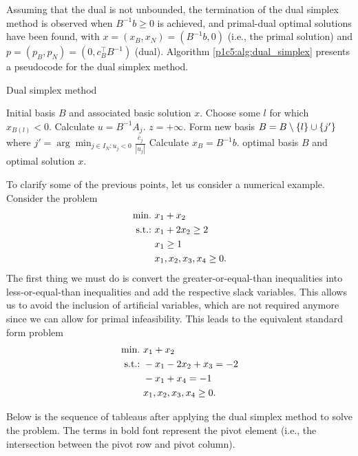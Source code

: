 Assuming that the dual is not unbounded, the termination of the dual simplex method is observed when $B^{-1}b \geq 0$ is achieved, and primal-dual optimal solutions have been found, with $x = (x_B,x_N) = (B^{-1}b, 0)$ (i.e., the primal solution) and $p = (p_B, p_N) = (0, c_B^\top B^{-1})$ (dual). Algorithm \ref{p1c5:alg:dual_simplex} presents a pseudocode for the dual simplex method.

\begin{algorithm}[h]
	\caption{Dual simplex method} \label{p1c5:alg:dual_simplex}
	\begin{algorithmic}[1] %
		 Initial basis $B$ and associated basic solution $x$.
		 \label{alg:opt_condition} 
			\State Choose some $l$ for which $x_{B(l)} < 0$. Calculate $u = B^{-1}A_j$. 
			 \label{alg:unb_condition}
				 $z = +\infty$.		
			\Else
				\State Form new basis $B = B \setminus \left\{ l \right \} \cup \left\{ j' \right \}$ where $j' = \arg\min_{j \in I_N : u_j < 0} \frac{\overline{c}_j}{|u_j|}$ 
				\State Calculate $x_B = B^{-1}b$.
			\EndIf
		\EndWhile
		 optimal basis $B$ and optimal solution $x$.
	\end{algorithmic}
\end{algorithm}

To clarify some of the previous points, let us consider a numerical example. Consider the problem 
%
\begin{align*}
	\mathop{\text{min.~}} &x_1 + x_2 \\
	\mathop{\text{s.t.:~}} &x_1 + 2x_2 \geq 2 \\
	&x_1 \geq  1 \\
	&x_1,x_2,x_3,x_4 \geq 0.	
\end{align*}	
%
The first thing we must do is convert the greater-or-equal-than inequalities into less-or-equal-than inequalities and add the respective slack variables. This allows us to avoid the inclusion of artificial variables, which are not required anymore since we can allow for primal infeasibility. This leads to the equivalent standard form problem
%
\begin{align*}
	\mathop{\text{min.~}} &x_1 + x_2 \\
	\mathop{\text{s.t.:~}} &-x_1 - 2x_2 + x_3 = -2 \\
	&-x_1 + x_4 = -1 \\
	&x_1,x_2,x_3,x_4 \geq 0.	
\end{align*}

Below is the sequence of tableaus after applying the dual simplex method to solve the problem. The terms in bold font represent the pivot element (i.e., the intersection between the pivot row and pivot column). 

